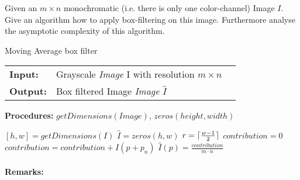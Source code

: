 \documentclass{paper}
\DeclarePairedDelimiter\ceil{\lceil}{\rceil}
\begin{document}
Given an $m \times n$ monochromatic (i.e. there is only one color-channel) Image $I$. 
Give an algorithm how to apply box-filtering on this image. Furthermore analyse the asymptotic complexity of this algorithm.

\begin{algorithm}[H]
\caption{Moving Average box filter}
\begin{table}[H]
  \begin{tabular}{@{}lll@{}}
    \textbf{Input:} & Grayscale \emph{Image} I with resolution $m \times n$  \\
    \textbf{Output:} & Box filtered Image \emph{Image} $\hat{I}$   \\
  \end{tabular} 
\end{table}
\textbf{Procedures:} $getDimensions(Image)$, $zeros(height, width)$  \\
\setlength{\fboxrule}{0pt} 
\begin{boxedminipage}{1.0\textwidth}
  \begin{algorithmic}[1]
      \State $ [h,w] = getDimensions(I)$
      \State $ \hat{I} = zeros(h,w)$
      \State $ r = \ceil{\frac{w-1}{2}}$
        \State $ contribution = 0$
            \State $ contribution = contribution + I(p+p_n)$
        \EndFor
        \State $ \hat{I}(p) = \frac{contribution}{m \cdot n}$
      \EndFor
  \end{algorithmic}
  \end{boxedminipage}
  \vskip1.5pt
\label{alg:boxfilter}
\end{algorithm}

\paragraph{Remarks:}
\end{document}
